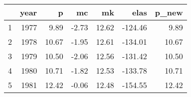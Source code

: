 \begin{table}[ht]
\centering
\begin{tabular}{rrrrrrr}
  \hline
 & year & p & mc & mk & elas & p\_new \\ 
  \hline
1 & 1977 & 9.89 & -2.73 & 12.62 & -124.46 & 9.89 \\ 
  2 & 1978 & 10.67 & -1.95 & 12.61 & -134.01 & 10.67 \\ 
  3 & 1979 & 10.50 & -2.06 & 12.56 & -131.42 & 10.50 \\ 
  4 & 1980 & 10.71 & -1.82 & 12.53 & -133.78 & 10.71 \\ 
  5 & 1981 & 12.42 & -0.06 & 12.48 & -154.55 & 12.42 \\ 
   \hline
\end{tabular}
\label{tab:post_merger_mean}
\end{table}
